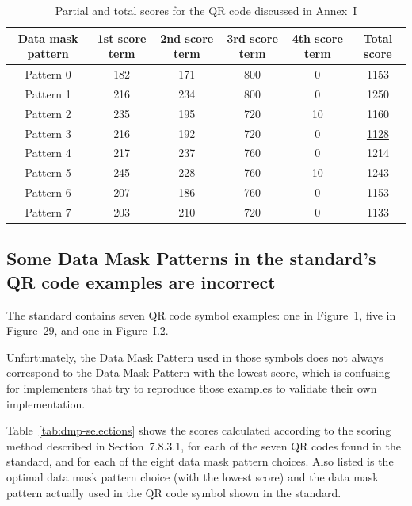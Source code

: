 \documentclass[a4paper,twoside]{article}
\newcommand{\best}[1]{\underline{#1}}
\begin{document}
\begin{table}[h!]
\centering
\small
\begin{tabular}{|c|c|c|c|c|c|}
\hline
Data mask pattern & 1st score term & 2nd score term & 3rd score term & 4th score term & Total score \\
\hline
Pattern 0            & 182              & 171               & 800              &  0                & 1153        \\
Pattern 1            & 216              & 234               & 800              &  0                & 1250        \\
Pattern 2            & 235              & 195               & 720              & 10                & 1160        \\
Pattern 3            & 216              & 192               & 720              &  0                & \best{1128} \\
Pattern 4            & 217              & 237               & 760              &  0                & 1214        \\
Pattern 5            & 245              & 228               & 760              & 10                & 1243        \\
Pattern 6            & 207              & 186               & 760              &  0                & 1153        \\
Pattern 7            & 203              & 210               & 720              &  0                & 1133        \\
\hline
\end{tabular}
\caption{Partial and total scores for the QR code discussed in Annex~I}
\label{tab:dmp-selection-annex-example}
\end{table}

\subsection{Some Data Mask Patterns in the standard's QR code examples are incorrect}

The standard contains seven QR code symbol examples: one in Figure~1, five in Figure~29, and one in Figure~I.2.

Unfortunately, the Data Mask Pattern used in those symbols does not always correspond to the Data Mask Pattern
with the lowest score, which is confusing for implementers that try to reproduce those examples to validate
their own implementation.

Table~\ref{tab:dmp-selections} shows the scores calculated according to the scoring method described in Section~7.8.3.1,
for each of the seven QR codes found in the standard, and for each of the eight data mask pattern choices.
Also listed is the optimal data mask pattern choice (with the  lowest score) and the data mask pattern actually
used in the QR code symbol shown in the standard.
\end{document}
